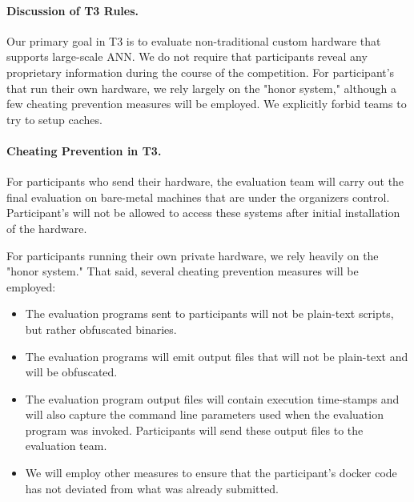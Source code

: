 \paragraph{Discussion of T3 Rules.}
Our primary goal in T3 is to evaluate non-traditional custom hardware that supports large-scale ANN.
We do not require that participants reveal any proprietary information during the course of the competition.  For
participant's that run their own hardware, we rely largely on the "honor system," although a few cheating
prevention measures will be employed. We explicitly forbid teams to try to setup caches. 

\paragraph{Cheating Prevention in T3.} 

For participants who send their hardware, the evaluation team will carry out the final evaluation on 
bare-metal machines that are under the organizers control. Participant's will not be allowed to access 
these systems after initial installation of the hardware.  

For participants running their own private hardware, we rely heavily on the "honor system." 
That said, several cheating prevention measures will be employed:

\begin{itemize}
\item The evaluation programs sent to participants will not be plain-text scripts, but rather obfuscated binaries.
\item The evaluation programs will emit output files that will not be plain-text and will be obfuscated.
\item The evaluation program output files will contain execution time-stamps and will also capture the command line parameters used when 
the evaluation program was invoked.  Participants will send these output files to the evaluation team.
\item We will employ other measures to ensure that the participant's docker code has not deviated from what was already submitted.
\end{itemize}


